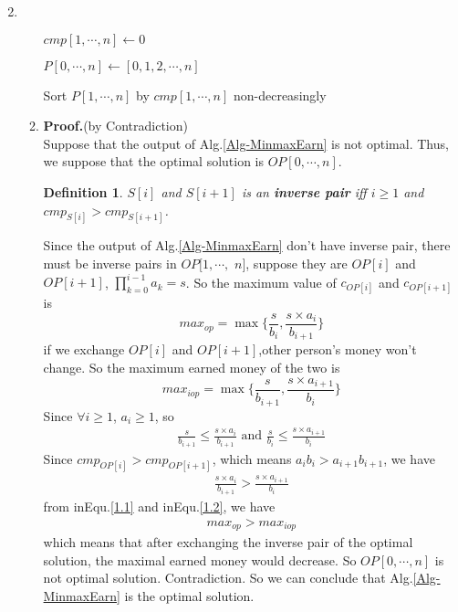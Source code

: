 \documentclass[12pt,a4paper]{article}
\makeatletter
\newtheorem*{solution}{Solution}
\newtheorem{definition}{Definition}
\theoremstyle{definition}
\renewenvironment{solution}[1][Solution] {\par\pushQED{\qed}\normalfont\topsep6\p@\@plus6\p@\relax\trivlist\item[\hskip\labelsep\bfseries#1\@addpunct{.}]\ignorespaces}{\popQED\endtrivlist\@endpefalse} \makeatother
\makeatother
\begin{document}
\begin{enumerate}
\begin{solution}
\begin{enumerate}
\begin{minipage}[t]{0.85\textwidth}
\begin{algorithm}[H]
        		
        			$cmp[1,\cdots,n] \leftarrow 0$\;
        			
        			$P[0,\cdots,n] \leftarrow [0,1,2,\cdots,n]$\;
        			
        			
        			Sort $P[1,\cdots,n]$ by $ cmp[1,\cdots,n] $ non-decreasingly\;
        			
        			\;
        			
        		\end{algorithm}
        	\end{minipage}
        \item
       	\textbf{Proof.}(by Contradiction)\\
       	Suppose that the output of Alg.\ref{Alg-MinmaxEarn} is not optimal. Thus, we suppose that the optimal solution is $OP[0,\cdots,n]$.
       	\begin{definition}
       		 $ S[i] $  and  $ S[i+1] $ is an \textbf{inverse pair} iff $ i \geq 1 $ and $ cmp_{S[i]} > cmp_{S[i+1]} $. 
       	\end{definition}
        Since the output of Alg.\ref{Alg-MinmaxEarn} don't have inverse pair, there must be inverse pairs in $OP[1,\cdots,$ $n]$, suppose they are $ OP[i]$ and $ OP[i+1] $, $\prod_{k = 0}^{i-1} a_{k} = s$. So the maximum value of $c_{OP[i]} $ and $ c_{OP[i+1]} $ is
        $$ max_{op} = \max \{\frac{s}{b_i}, \frac{s\times a_{i}}{b_{i+1}}\}$$
        if we exchange $ OP[i]$ and $ OP[i+1] $,other person's money won't change. So the maximum earned money of the two is
        $$ max_{iop} = \max \{\frac{s}{b_{i+1}}, \frac{s\times a_{i+1}}{b_{i}}\} $$
        Since $ \forall i \geq 1 $, $ a_i \geq 1 $, so
        \begin{align}\label{1.1}
        	\frac{s}{b_{i+1}} \leq \frac{s\times a_{i}}{b_{i+1}}\text{ and } \frac{s}{b_i} \leq  \frac{s\times a_{i+1}}{b_{i}} 
        \end{align}
        Since $ cmp_{OP[i]} > cmp_{OP[i+1]} $, which means $ a_{i}b_{i} > a_{i+1}b_{i+1} $, we have
        \begin{align}\label{1.2}
        	\frac{s\times a_{i}}{b_{i+1}} > \frac{s\times a_{i+1}}{b_{i}} 
        \end{align}
        from inEqu.\ref{1.1} and inEqu.\ref{1.2}, we have
        \begin{align}
        	max_{op} > max_{iop}
        \end{align}
        which means that after exchanging the inverse pair of the optimal solution, the maximal earned money would decrease. So $OP[0,\cdots,n]$ is not optimal solution. Contradiction.
        So we can conclude that Alg.\ref{Alg-MinmaxEarn} is the optimal solution.
        \end{enumerate}
    \end{solution}


\end{enumerate}
\end{document}

